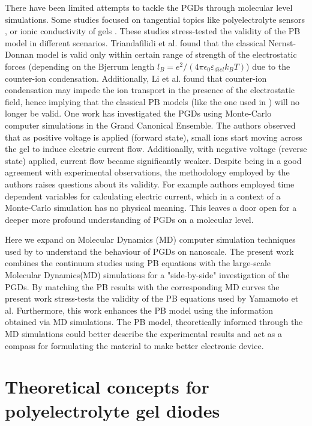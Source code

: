 \documentclass[twoside,twocolumn,9pt]{article}
\begin{document}
There have been limited attempts to tackle the PGDs through molecular level simulations. Some studies focused on tangential topics like polyelectrolyte sensors \cite{Triandafilidi2018MolecularEffect}, or ionic conductivity of gels \cite{Li2016}. These studies stress-tested the validity of the PB model in different scenarios. Triandafilidi et al. \cite{Triandafilidi2018MolecularEffect} found that the classical Nernst-Donnan model is valid only within certain range of strength of the electrostatic forces (depending on the Bjerrum length $l_B = e^2/(4 \pi \epsilon_0\varepsilon_{diel}k_B T)$) due to the counter-ion condensation. Additionally, Li et al. \cite{Li2016} found that counter-ion condensation may impede the ion transport in the presence of the electrostatic field, hence implying that the classical PB models (like the one used in \cite{Yamamoto2014ElectrochemicalDiodes}) will no longer be valid. One work \cite{Lee2012Grand-canonicalDiode} has investigated the PGDs using Monte-Carlo computer simulations in the Grand Canonical Ensemble. The authors observed that as positive voltage is applied (forward state), small ions start moving across the gel to induce electric current flow. Additionally, with negative voltage (reverse state) applied, current flow became significantly weaker. Despite being in a good agreement with experimental observations, the methodology employed by the authors raises questions about its validity. For example authors employed time dependent variables  for calculating electric current, which in a context of a Monte-Carlo simulation has no physical meaning. This leaves a door open for a deeper more profound understanding of PGDs on a molecular level.


Here we expand on Molecular Dynamics (MD) computer simulation techniques used by \cite{Li2016,Triandafilidi2018MolecularEffect} to understand the behaviour of PGDs on nanoscale.  The present work combines the continuum studies using PB equations with the large-scale Molecular Dynamics(MD) simulations for a "side-by-side" investigation of the PGDs. By matching the PB results with the corresponding MD curves the present work stress-tests the validity of the PB equations used by Yamamoto et al. Furthermore, this work enhances the PB model using the information obtained via MD simulations. The PB model, theoretically informed through the MD simulations could better describe the experimental results and act as a compass for formulating the material to make better electronic device.
\section{Theoretical concepts for polyelectrolyte gel diodes}
\label{theor_background}
\end{document}
